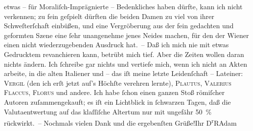 \begin{ledgroupsized}[t]{13cm}
                    etwas – für Moraliſch-Imprägnierte – Bedenk{\pb}liches haben dürfte, kann ich nicht
                    verkennen; zu fein geſpielt dürften die beiden Damen zu viel von ihrer
                    Schweſterſchaft einbüßen, und eine Vergröberung aus der fein gedachten und
                    geformten Szene eine ſehr unangenehme jenes Neides machen, für den der Wiener einen nicht wiederzugebenden Ausdruck
                    hat. –\pend
           \pstart
           Daß ich mich nie mit etwas Gedrucktem revanchieren kann, betrübt mich tief. Aber
                    die Zeiten wollen daran nichts ändern. Ich ſchreibe gar nichts und vertiefe
                    mich, wenn ich nicht an Akten arbeite, in die alten Italiener und – das iſt meine letzte Leidenſchaft –
                    Lateiner: \textsc{Vergil} (den ich erſt jetzt auf's Höchſte
                    verehren lernte), \textsc{Plautus}, \textsc{Valerius Flaccus}, \textsc{Florus} und andere. Ich habe ſchon einen
                    ganzen Stoß römiſcher Autoren zuſammengekauft; es iſt ein Lichtblick in
                    ſchwarzen Tagen, daß die Valutaentwertung auf das klaſſiſche Altertum nur mit
                    ungefähr 50 {\%} rückwirkt. –\pend
           \pstart
           Nochmals vielen Dank und die ergebenſten Grüße!\hspace*{3.5em}Ihr\pend
           \pstart \spacefill\mbox{D\textsuperscript{r}RAdam}\pend{}
         
         \endnumbering{}\end{ledgroupsized}  \newcommand{\dateiname}{L02335}\newcommand{\titel}{Robert Adam an Arthur Schnitzler, 13. 2. 1920}\newcommand{\editorInnen}{Martin Anton Müller und Gerd-Hermann Susen}
      